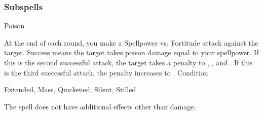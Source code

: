 \subsubsection{Subspells}
\begin{spellsection}{Poison}
\begin{spellheader}
\end{spellheader}
\begin{spellcontent}
\begin{spelltargetinginfo}
\end{spelltargetinginfo}
\begin{spelleffects}
\spelleffect
At the end of each round, you make a Spellpower vs. Fortitude attack against the target.
Success means the target takes poison damage equal to your spellpower.
If this is the second successful attack, the target takes a  penalty to , , and .
If this is the third successful attack, the penalty increases to .
\spelldur Condition
\end{spelleffects}
\end{spellcontent}
\begin{spellfooter}
 Extended, Mass, Quickened, Silent, Stilled
\end{spellfooter}
\begin{spellsubcontent}
\begin{spellcantrip}
The spell does not have additional effects other than damage.
\end{spellcantrip}
\end{spellsubcontent}
\end{spellsection}
